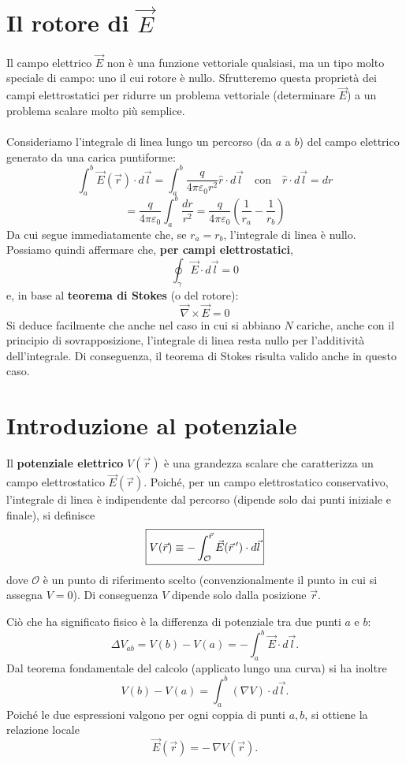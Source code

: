 \documentclass{book}
\begin{document}
\section{Il rotore di $\vec{E}$}
Il campo elettrico $\vec{E}$ non è una funzione vettoriale qualsiasi, ma un tipo molto speciale di campo: uno il cui rotore è nullo.  
Sfrutteremo questa proprietà dei campi elettrostatici per ridurre un problema vettoriale (determinare $\vec{E}$) a un problema scalare molto più semplice.
\\
\\
Consideriamo l’integrale di linea lungo un percorso (da $a$ a $b$) del campo elettrico generato da una carica puntiforme:
\[
\int_a^b \vec{E}(\vec{r}) \cdot d\vec{l} 
= \int_a^b \frac{q}{4\pi \varepsilon_0 r^2} \hat{r} \cdot d\vec{l} 
\quad \text{con} \quad \hat{r} \cdot d\vec{l} = dr
\]
\[
= \frac{q}{4\pi \varepsilon_0} \int_a^b \frac{dr}{r^2} 
= \frac{q}{4\pi \varepsilon_0} \left( \frac{1}{r_a} - \frac{1}{r_b} \right)
\]
Da cui segue immediatamente che, se $r_a = r_b$, l’integrale di linea è nullo.  
Possiamo quindi affermare che, \textbf{per campi elettrostatici},
\[
\oint_{\gamma} \vec{E} \cdot d\vec{l} = 0
\]
e, in base al \textbf{teorema di Stokes} (o del rotore):
\[
\boxed{
\vec{\nabla} \times \vec{E} = 0
}
\]
Si deduce facilmente che anche nel caso in cui si abbiano $N$ cariche, anche con il principio di sovrapposizione, l’integrale di linea resta nullo per l’additività dell’integrale.  
Di conseguenza, il teorema di Stokes risulta valido anche in questo caso.

\section{Introduzione al potenziale}

Il \textbf{potenziale elettrico} \(V(\vec r)\) è una grandezza scalare che caratterizza un campo elettrostatico \(\vec{E}(\vec r)\).
Poiché, per un campo elettrostatico conservativo, l'integrale di linea è indipendente dal percorso (dipende solo dai punti iniziale e finale), si definisce
\[
\boxed{%
V(\vec{r}) \equiv - \int_{\mathcal{O}}^{\vec{r}} \vec{E}(\vec{r}\,') \cdot d\vec{l}
}
\]
dove \(\mathcal{O}\) è un punto di riferimento scelto (convenzionalmente il punto in cui si assegna \(V=0\)). Di conseguenza \(V\) dipende solo dalla posizione \(\vec r\).

Ciò che ha significato fisico è la differenza di potenziale tra due punti \(a\) e \(b\):
\[
\Delta V_{ab} = V(b)-V(a) = -\int_{a}^{b} \vec{E}\cdot d\vec{l}.
\]
Dal teorema fondamentale del calcolo (applicato lungo una curva) si ha inoltre
\[
V(b)-V(a)=\int_{a}^{b} (\nabla V)\cdot d\vec{l}.
\]
Poiché le due espressioni valgono per ogni coppia di punti \(a,b\), si ottiene la relazione locale
\[
\boxed{\vec{E}(\vec r) = -\,\nabla V(\vec r).}
\]
\end{document}
